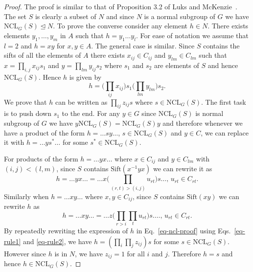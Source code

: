 \documentclass[11pt]{madras}%
\theoremstyle{remark}
\newcommand{\NCL}[2][]{\ensuremath{\mathrm{NCL}_{#1}({#2})}}
\newcommand{\Sift}[1]{{\ensuremath{\mathrm{Sift}({#1})}}}
\begin{document}
\begin{proof}
  The proof is similar to that of Proposition 3.2 of Luks and
  McKenzie~\cite{luks88solvable}. The set $S$ is clearly a subset of
  $N$ and since $N$ is a normal subgroup of $G$ we have $\NCL[G]{S}
  \unlhd N$. To prove the converse consider any element $h \in N$.
  There exists elements $y_1,\ldots,y_m$ in $A$ such that $h =
  y_1\ldots y_l$. For ease of notation we assume that $l =2$ and $h
  = xy$ for $x,y \in A$.  The general case is similar. Since $S$
  contains the sifts of all the elements of $A$ there exists
  $x_{ij}\in C_{ij}$ and $y_{lm} \in C_{lm}$ such that $x =
  \prod_{i,j} x_{ij} s_1$ and $y = \prod_{lm}y_{ij} s_2$ where $s_1$
  and $s_2$ are elements of $S$ and hence $\NCL[G]{S}$. Hence $h$ is
  given by
  \begin{equation}\label{eq-ncl-proof}
    h = \biggl(\prod_{ij} x_{ij}\biggr)s_1 \biggl(\prod_{lm}
    y_{lm}\biggr)s_2.
  \end{equation}
  We prove that $h$ can be written as $\prod_{ij} z_{ij} s$ where $s
  \in \NCL[G]{S}$.  The first task is to push down $s_1$ to the end.
  For any $y \in G$ since $\NCL[G]{S}$ is normal subgroup of $G$ we
  have $y \NCL[G]{S} = \NCL[G]{S}y$ and therefore whenever we have a
  product of the form $h = \ldots s y \ldots$, $s \in \NCL[G]{S}$ and
  $y \in C$, we can replace it with $h = \ldots y s^* \ldots$ for some
  $s^* \in \NCL[G]{S}$. 

  For products of the form $h = \ldots y x \ldots$ where $x \in
  C_{ij}$ and $y \in C_{lm}$ with $(i,j) < (l,m)$, since $S$ contains
  $\Sift{x^{-1}yx}$ we can rewrite it as
  \begin{equation} \label{eq-rule1} h = \ldots y x \ldots = \ldots x
    \Biggl(\prod_{(r,t)>(i,j)} u_{rt}\Biggr) s \ldots\textrm{, }
    u_{rt} \in C_{rt}.
  \end{equation}
  Similarly when $h = \ldots xy \ldots$ where $x,y \in C_{ij}$, since
  $S$ contains $\Sift{xy}$ we can rewrite $h$ as
  \begin{equation}\label{eq-rule2}
    h = \ldots x y \ldots = \ldots z \Biggl(\prod_{r>i}\prod_t
    u_{rt}\Biggr) s \ldots.\textrm{, }
    u_{rt} \in C_{rt}.
  \end{equation}
  By repeatedly rewriting the expression of $h$ in
  Eq.~\ref{eq-ncl-proof} using Eqs.~\ref{eq-rule1} and \ref{eq-rule2},
  we have $h = (\prod_{i} \prod_j z_{ij}) s$ for some $s \in
  \NCL[G]{S}$.  However since $h$ is in $N$, we have $z_{ij} = 1$ for
  all $i$ and $j$. Therefore $h = s$ and hence $h \in \NCL[G]{S}$.
\end{proof}
\end{document}
